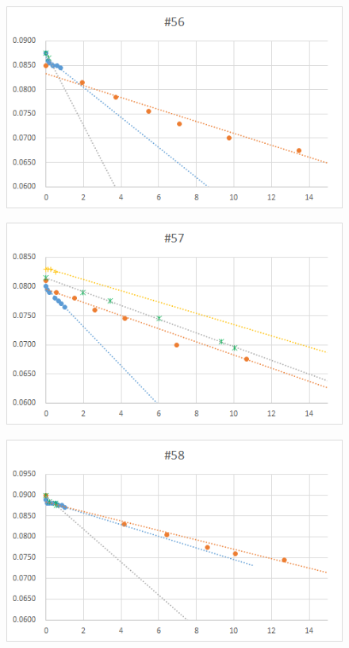 \documentclass[12pt,a4paper]{jarticle}
\begin{document}
\begin{figure}[htbp]
  \centering
     \includegraphics[width=120mm]{vol_056.png}
\end{figure}
\begin{figure}[htbp]
  \centering
     \includegraphics[width=120mm]{vol_057.png}
\end{figure}
\begin{figure}[htbp]
  \centering
     \includegraphics[width=120mm]{vol_058.png}
\end{figure}
\end{document}
